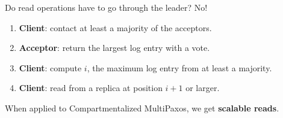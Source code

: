 Do read operations have to go through the leader? No!
\begin{enumerate}
  \item
    \textbf{Client}: contact at least a majority of the acceptors.
  \item
    \textbf{Acceptor}: return the largest log entry with a vote.
  \item
    \textbf{Client}: compute $i$, the maximum log entry from at least a majority.
  \item
    \textbf{Client}: read from a replica at position $i+1$ or larger.
\end{enumerate}

{}

When applied to Compartmentalized MultiPaxos, we get \textbf{scalable reads}.
